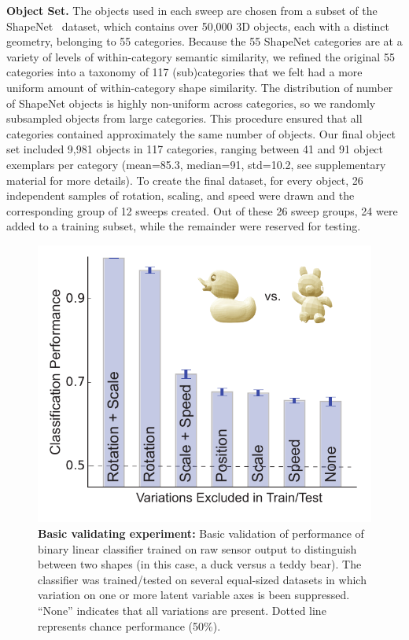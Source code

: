 \textbf{Object Set.} The objects used in each sweep are chosen from a subset of the ShapeNet~\cite{Chang2015} dataset, which contains over 50,000 3D objects, each with a distinct geometry, belonging to 55 categories.
Because the 55 ShapeNet categories are at a variety of levels of within-category semantic similarity, we refined the original 55 categories into a taxonomy of 117 (sub)categories that we felt had a more uniform amount of within-category shape similarity. 
The distribution of number of ShapeNet objects is highly non-uniform across categories, so we randomly subsampled objects from large categories.  
This procedure ensured that all categories contained approximately the same number of objects.  
Our final object set included 9,981 objects in 117 categories, ranging between 41 and 91 object exemplars per category (mean=85.3, median=91, std=10.2, see supplementary material for more details). 
To create the final dataset, for every object, 26 independent samples of rotation, scaling, and speed were drawn and the corresponding group of 12 sweeps created.   
Out of these 26 sweep groups, 24 were added to a training subset, while the remainder were reserved for testing.

\begin{figure}
\FigCenter
\includegraphics [width=\SmallFigSize\linewidth]{figures/control_exp.pdf}
\vspace{-3mm}
\caption{\footnotesize{\textbf{Basic validating experiment:} 
Basic validation of performance of binary linear classifier trained on raw sensor output to distinguish between two shapes (in this case, a duck versus a teddy bear).  The classifier was trained/tested on several equal-sized datasets in which variation on one or more latent variable axes is been suppressed. ``None'' indicates that all variations are present.  Dotted line represents chance performance (50\%).}~\label{fig_control}}
\vspace{-6mm}
\end{figure}

